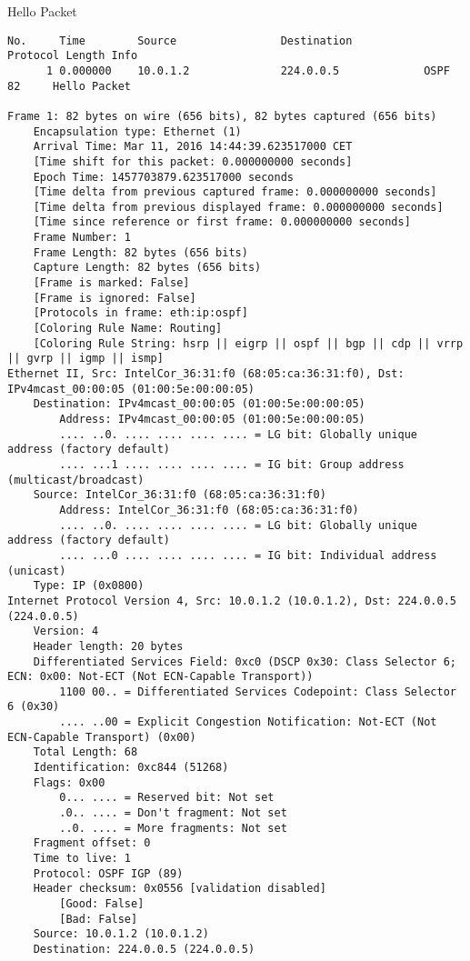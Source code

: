 Hello Packet
\begin{lstlisting}
No.     Time        Source                Destination           Protocol Length Info
      1 0.000000    10.0.1.2              224.0.0.5             OSPF     82     Hello Packet

Frame 1: 82 bytes on wire (656 bits), 82 bytes captured (656 bits)
    Encapsulation type: Ethernet (1)
    Arrival Time: Mar 11, 2016 14:44:39.623517000 CET
    [Time shift for this packet: 0.000000000 seconds]
    Epoch Time: 1457703879.623517000 seconds
    [Time delta from previous captured frame: 0.000000000 seconds]
    [Time delta from previous displayed frame: 0.000000000 seconds]
    [Time since reference or first frame: 0.000000000 seconds]
    Frame Number: 1
    Frame Length: 82 bytes (656 bits)
    Capture Length: 82 bytes (656 bits)
    [Frame is marked: False]
    [Frame is ignored: False]
    [Protocols in frame: eth:ip:ospf]
    [Coloring Rule Name: Routing]
    [Coloring Rule String: hsrp || eigrp || ospf || bgp || cdp || vrrp || gvrp || igmp || ismp]
Ethernet II, Src: IntelCor_36:31:f0 (68:05:ca:36:31:f0), Dst: IPv4mcast_00:00:05 (01:00:5e:00:00:05)
    Destination: IPv4mcast_00:00:05 (01:00:5e:00:00:05)
        Address: IPv4mcast_00:00:05 (01:00:5e:00:00:05)
        .... ..0. .... .... .... .... = LG bit: Globally unique address (factory default)
        .... ...1 .... .... .... .... = IG bit: Group address (multicast/broadcast)
    Source: IntelCor_36:31:f0 (68:05:ca:36:31:f0)
        Address: IntelCor_36:31:f0 (68:05:ca:36:31:f0)
        .... ..0. .... .... .... .... = LG bit: Globally unique address (factory default)
        .... ...0 .... .... .... .... = IG bit: Individual address (unicast)
    Type: IP (0x0800)
Internet Protocol Version 4, Src: 10.0.1.2 (10.0.1.2), Dst: 224.0.0.5 (224.0.0.5)
    Version: 4
    Header length: 20 bytes
    Differentiated Services Field: 0xc0 (DSCP 0x30: Class Selector 6; ECN: 0x00: Not-ECT (Not ECN-Capable Transport))
        1100 00.. = Differentiated Services Codepoint: Class Selector 6 (0x30)
        .... ..00 = Explicit Congestion Notification: Not-ECT (Not ECN-Capable Transport) (0x00)
    Total Length: 68
    Identification: 0xc844 (51268)
    Flags: 0x00
        0... .... = Reserved bit: Not set
        .0.. .... = Don't fragment: Not set
        ..0. .... = More fragments: Not set
    Fragment offset: 0
    Time to live: 1
    Protocol: OSPF IGP (89)
    Header checksum: 0x0556 [validation disabled]
        [Good: False]
        [Bad: False]
    Source: 10.0.1.2 (10.0.1.2)
    Destination: 224.0.0.5 (224.0.0.5)

\end{lstlisting}
